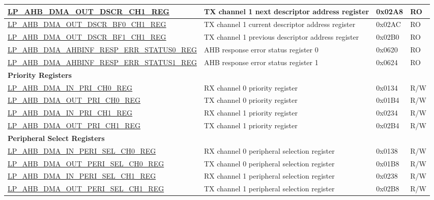 \begin{longtable}{ | l | p{10cm} | p{1.3cm} | l | }
\hyperref[regdesc:LPAHBDMAOUTDSCRCHNREG]{LP\_AHB\_DMA\_OUT\_DSCR\_CH1\_REG} & TX channel 1 next descriptor address register & 0x02A8 & RO \\ \hline
\hyperref[regdesc:LPAHBDMAOUTDSCRBF0CHNREG]{LP\_AHB\_DMA\_OUT\_DSCR\_BF0\_CH1\_REG} & TX channel 1 current descriptor address register & 0x02AC & RO \\ \hline
\hyperref[regdesc:LPAHBDMAOUTDSCRBF1CHNREG]{LP\_AHB\_DMA\_OUT\_DSCR\_BF1\_CH1\_REG} & TX channel 1 previous descriptor address register & 0x02B0 & RO \\ \hline
\hyperref[regdesc:LPAHBDMAAHBINFRESPERRSTATUS0REG]{LP\_AHB\_DMA\_AHBINF\_RESP\_ERR\_STATUS0\_REG} & AHB response error status register 0 & 0x0620 & RO \\ \hline
\hyperref[regdesc:LPAHBDMAAHBINFRESPERRSTATUS1REG]{LP\_AHB\_DMA\_AHBINF\_RESP\_ERR\_STATUS1\_REG} & AHB response error status register 1 & 0x0624 & RO \\ \hline
\multicolumn{4}{|l|}{\textbf{Priority Registers}} \\ \hline
\hyperref[regdesc:LPAHBDMAINPRICHNREG]{LP\_AHB\_DMA\_IN\_PRI\_CH0\_REG} & RX channel 0 priority register & 0x0134 & R/W \\ \hline
\hyperref[regdesc:LPAHBDMAOUTPRICHNREG]{LP\_AHB\_DMA\_OUT\_PRI\_CH0\_REG} & TX channel 0 priority register & 0x01B4 & R/W \\ \hline
\hyperref[regdesc:LPAHBDMAINPRICHNREG]{LP\_AHB\_DMA\_IN\_PRI\_CH1\_REG} & RX channel 1 priority register & 0x0234 & R/W \\ \hline
\hyperref[regdesc:LPAHBDMAOUTPRICHNREG]{LP\_AHB\_DMA\_OUT\_PRI\_CH1\_REG} & TX channel 1 priority register & 0x02B4 & R/W \\ \hline
\multicolumn{4}{|l|}{\textbf{Peripheral Select Registers}} \\ \hline
\hyperref[regdesc:LPAHBDMAINPERISELCHNREG]{LP\_AHB\_DMA\_IN\_PERI\_SEL\_CH0\_REG} & RX channel 0 peripheral selection register & 0x0138 & R/W \\ \hline
\hyperref[regdesc:LPAHBDMAOUTPERISELCHNREG]{LP\_AHB\_DMA\_OUT\_PERI\_SEL\_CH0\_REG} & TX channel 0 peripheral selection register & 0x01B8 & R/W \\ \hline
\hyperref[regdesc:LPAHBDMAINPERISELCHNREG]{LP\_AHB\_DMA\_IN\_PERI\_SEL\_CH1\_REG} & RX channel 1 peripheral selection register & 0x0238 & R/W \\ \hline
\hyperref[regdesc:LPAHBDMAOUTPERISELCHNREG]{LP\_AHB\_DMA\_OUT\_PERI\_SEL\_CH1\_REG} & TX channel 1 peripheral selection register & 0x02B8 & R/W \\ \hline
\end{longtable}
